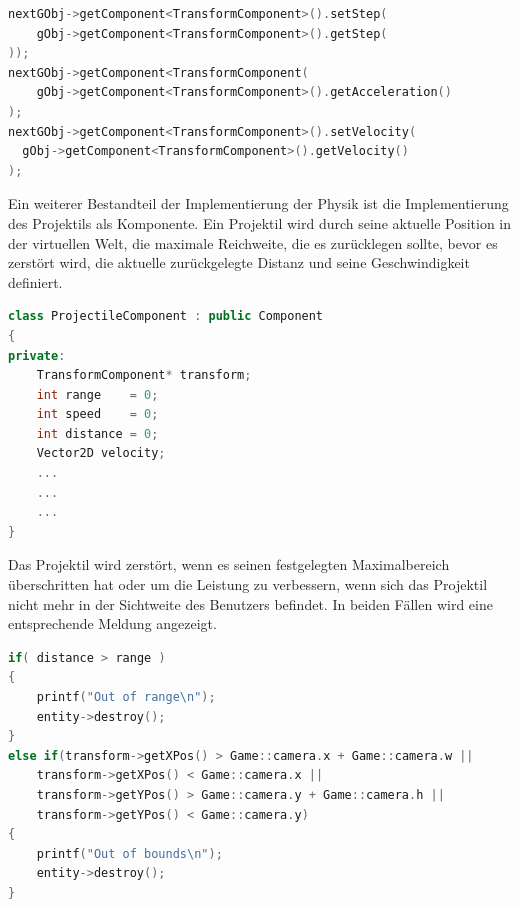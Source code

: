 \documentclass[
  10pt,
  a4paper,
  oneside,
  headers,
  headinclude,
  footinclude,
  BCOR5mm,
]{article}
\begin{document}
\begin{lstlisting}[language=C++]
nextGObj->getComponent<TransformComponent>().setStep(
    gObj->getComponent<TransformComponent>().getStep(
));
nextGObj->getComponent<TransformComponent(
    gObj->getComponent<TransformComponent>().getAcceleration()
);
nextGObj->getComponent<TransformComponent>().setVelocity(
  gObj->getComponent<TransformComponent>().getVelocity()
);
\end{lstlisting}

Ein weiterer Bestandteil der Implementierung der Physik ist die Implementierung
des Projektils als Komponente. Ein Projektil wird durch seine aktuelle Position
in der virtuellen Welt, die maximale Reichweite, die es zurücklegen sollte,
bevor es zerstört wird, die aktuelle zurückgelegte Distanz und seine
Geschwindigkeit definiert.

\begin{lstlisting}[language=C++]
class ProjectileComponent : public Component
{
private:
    TransformComponent* transform;
    int range    = 0;
    int speed    = 0;
    int distance = 0;
    Vector2D velocity;
    ...
    ...
    ...
}
\end{lstlisting}

Das Projektil wird zerstört, wenn es seinen festgelegten Maximalbereich
überschritten hat oder um die Leistung zu verbessern, wenn sich das Projektil
nicht mehr in der Sichtweite des Benutzers befindet. In beiden Fällen wird eine
entsprechende Meldung angezeigt.

\begin{lstlisting}[language=C++]
if( distance > range )
{
    printf("Out of range\n");
    entity->destroy();
}
else if(transform->getXPos() > Game::camera.x + Game::camera.w ||
    transform->getXPos() < Game::camera.x ||
    transform->getYPos() > Game::camera.y + Game::camera.h ||
    transform->getYPos() < Game::camera.y)
{
    printf("Out of bounds\n");
    entity->destroy();
}
\end{lstlisting}
\end{document}
